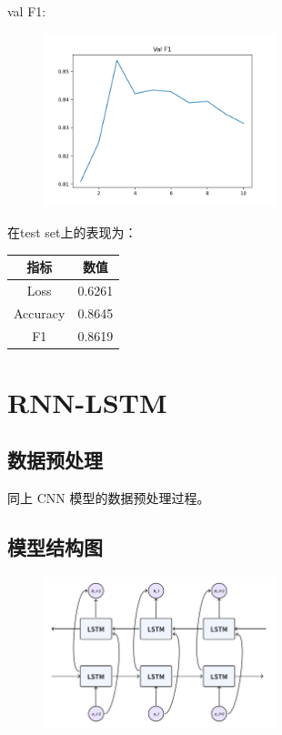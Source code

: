\documentclass{article}
\begin{document}
val F1:
\begin{figure}[htbp]
    \centering
    \includegraphics[width=0.6\textwidth]{../results/cnn_f1.png}
\end{figure}

\FloatBarrier

在test set上的表现为：

\begin{table}[H]
    \centering
    \begin{tabular}{|c|c|}
        \hline 
        {\bf 指标} & {\bf 数值} \\
        \hline
        Loss & 0.6261 \\
        \hline 
        Accuracy & 0.8645 \\
        \hline
        F1 & 0.8619 \\
        \hline
    \end{tabular}
\end{table}

\section{RNN-LSTM}

\subsection{数据预处理}
同上 CNN 模型的数据预处理过程。

\subsection{模型结构图}

\begin{figure}[htbp]
    \centering
    \includegraphics[width=0.6\textwidth]{img/lstm.png}
\end{figure}
\end{document}
